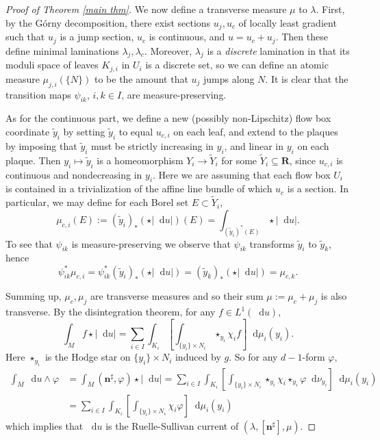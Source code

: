 \documentclass[reqno,11pt]{amsart}
\newcommand{\RR}{\mathbf{R}}
\newcommand*\dif{\mathop{}\!\mathrm{d}}
\newcommand{\normal}{\mathbf n}
\theoremstyle{definition}
\numberwithin{equation}{section}
\begin{document}
\begin{proof}[Proof of Theorem \ref{main thm}]
We now define a transverse measure $\mu$ to $\lambda$.
First, by the G\'orny decomposition, there exist sections $u_j, u_c$ of locally least gradient such that $u_j$ is a jump section, $u_c$ is continuous, and $u = u_c + u_j$.
Then these define minimal laminations $\lambda_j, \lambda_c$.
Moreover, $\lambda_j$ is a \emph{discrete} lamination in that its moduli space of leaves $K_{j,i}$ in $U_i$ is a discrete set, so we can define an atomic measure $\mu_{j,i}(\{N\})$ to be the amount that $u_j$ jumps along $N$.
It is clear that the transition maps $\psi_{ik}$, $i,k \in I$, are measure-preserving.

As for the continuous part, we define a new (possibly non-Lipschitz) flow box coordinate $\tilde y_i$ by setting $\tilde y_i$ to equal $u_{c,i}$ on each leaf, and extend to the plaques by imposing that $\tilde y_i$ must be strictly increasing in $y_i$, and linear in $y_i$ on each plaque.
Then $y_i \mapsto \tilde y_i$ is a homeomorphism $Y_i \to \tilde Y_i$ for some $\tilde Y_i \subseteq \RR$, since $u_{c,i}$ is continuous and nondecreasing in $y_i$.
Here we are assuming that each flow box $U_i$ is contained in a trivialization of the affine line bundle of which $u_c$ is a section.
In particular, we may define for each Borel set $E \subset \tilde Y_i$,
$$\mu_{c,i}(E) := (\tilde y_i)_*(\star |\dif u|)(E) = \int_{(\tilde y_i)^*(E)} \star |\dif u|.$$
To see that $\psi_{ik}$ is measure-preserving we observe that $\psi_{ik}$ transforms $\tilde y_i$ to $\tilde y_k$, hence
$$\psi_{ik}^* \mu_{c,i} = \psi_{ik}^* (\tilde y_i)_* (\star |\dif u|) = (\tilde y_k)_* (\star |\dif u|) = \mu_{c,k}.$$

Summing up, $\mu_c, \mu_j$ are transverse measures and so their sum $\mu := \mu_c + \mu_j$ is also transverse.
By the disintegration theorem, for any $f \in L^1(\dif u)$,
$$\int_M f \star |\dif u| = \sum_{i \in I} \int_{K_i} \left[\int_{\{y_i\} \times N_i} \star_{y_i} \chi_i f \right] \dif \mu_i(y_i).$$
Here $\star_{y_i}$ is the Hodge star on $\{y_i\} \times N_i$ induced by $g$.
So for any $d-1$-form $\varphi$,
\begin{align*}
\int_M \dif u \wedge \varphi &= \int_M (\normal^\sharp, \varphi) \star |\dif u|
= \sum_{i \in I} \int_{K_i} \left[\int_{\{y_i\} \times N_i} \star_{y_i} \chi_i \star_{y_i} \varphi \dif \nu_{y_i}\right] \dif \mu_i(y_i) \\
&= \sum_{i \in I} \int_{K_i} \left[\int_{\{y_i\} \times N_i} \chi_i \varphi\right] \dif \mu_i(y_i)
\end{align*}
which implies that $\dif u$ is the Ruelle-Sullivan current of $(\lambda, [\normal^\sharp], \mu)$.


\end{proof}
\end{document}
